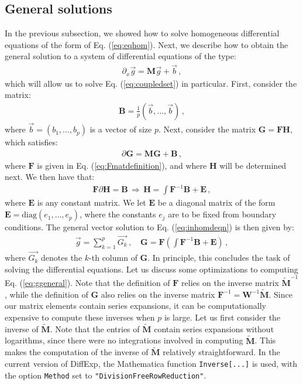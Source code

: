 \documentclass{article}
\begin{document}
\subsection{General solutions}
\label{sec:gensols}
In the previous subsection, we showed how to solve homogeneous differential equations of the form of Eq. (\ref{eq:eqhom}). Next, we describe how to obtain the general solution to a system of differential equations of the type:
\begin{align}
    \label{eq:inhomdeqn}
    \partial_x \vec{g} = \mathbf{M} \vec{g} + \vec{b}\,,
\end{align}
which will allow us to solve Eq. (\ref{eq:coupledset}) in particular. First, consider the matrix:
\begin{align}
    \mathbf{B} = \frac{1}{p}(\vec{b},\ldots,\vec{b})\,,
\end{align}
where $\vec{b} = (b_{1},\ldots,b_{p})$ is a vector of size $p$. Next, consider the matrix $\mathbf{G} = \mathbf{F}\mathbf{H}$, which satisfies:
\begin{align}
    \partial \mathbf{G} = \mathbf{M}\mathbf{G} + \mathbf{B}\,,
\end{align}
where $\mathbf{F}$ is given in Eq. (\ref{eq:Fmatdefinition}), and where $\mathbf{H}$ will be determined next. We then have that:
\begin{align}
    \mathbf{F}\partial \mathbf{H} = \mathbf{B}\,\Rightarrow\, \mathbf{H} = \int \mathbf{F}^{-1}\mathbf{B} + \mathbf{E}\,,
\end{align}
where $\mathbf{E}$ is any constant matrix. We let $\mathbf{E}$ be a diagonal matrix of the form $\mathbf{E} = \text{diag}(e_1,\ldots,e_p)$, where the constants $e_j$ are to be fixed from boundary conditions. The general vector solution to Eq. (\ref{eq:inhomdeqn}) is then given by:
\begin{align}
    \label{eq:ggeneral}
    \vec{g} = \sum_{k=1}^p \vec{G_k}\,,\quad \mathbf{G} = \mathbf{F}\left(\int \mathbf{F}^{-1}\mathbf{B} + \mathbf{E}\right)\,,
\end{align}
where $\vec{G_k}$ denotes the $k$-th column of $\mathbf{G}$. In principle, this concludes the task of solving the differential equations. Let us discuss some optimizations to computing Eq. (\ref{eq:ggeneral}). Note that the definition of $\mathbf{F}$ relies on the inverse matrix $\tilde{\mathbf{M}}^{-1}$, while the definition of $\mathbf{G}$ also relies on the inverse matrix $\mathbf{F}^{-1} = \mathbf{W}^{-1} \tilde{\mathbf{M}}$. Since our matrix elements contain series expansions, it can be computationally expensive to compute these inverses when $p$ is large. Let us first consider the inverse of $\tilde{\mathbf{M}}$. Note that the entries of $\tilde{\mathbf{M}}$ contain series expansions without logarithms, since there were no integrations involved in computing $\tilde{\mathbf{M}}$. This makes the computation of the inverse of $\tilde{\mathbf{M}}$ relatively straightforward. In the current version of DiffExp, the Mathematica function \texttt{Inverse[...]} is used, with the option \texttt{Method} set to \texttt{"DivisionFreeRowReduction"}.
\end{document}

